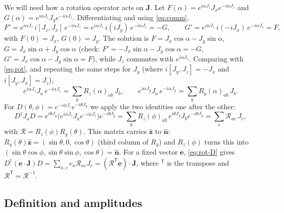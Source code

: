 \documentclass[11pt,a4paper]{article}
\newcommand{\vJ}{\bm{J}}
\newcommand{\vn}{\hat{\bm n}}
\begin{document}
We will need how a rotation operator acts on $\vJ$. Let $F(\alpha) = e^{i\alpha J_z}J_xe^{-i\alpha J_z}$ and
$G(\alpha) = e^{i\alpha J_z}J_ye^{-i\alpha J_z}$. Differentiating and using \eqref{eq:comm},
\begin{equation*}
  F' = e^{i\alpha J_z}\,i[J_z,J_x]\,e^{-i\alpha J_z} = e^{i\alpha J_z}\,i(iJ_y)\,e^{-i\alpha J_z} = -G,\qquad
  G' = e^{i\alpha J_z}\,i(-iJ_x)\,e^{-i\alpha J_z} = F,
\end{equation*}
with $F(0) = J_x$, $G(0) = J_y$. The solution is $F = J_x\cos\alpha - J_y\sin\alpha$, $G = J_x\sin\alpha +
J_y\cos\alpha$ (check: $F' = -J_x\sin\alpha - J_y\cos\alpha = -G$, $G' = J_x\cos\alpha - J_y\sin\alpha = F$), while
$J_z$ commutes with $e^{i\alpha J_z}$. Comparing with \eqref{eq:rot}, and repeating the same steps for $J_y$ (where
$i[J_y,J_z] = -J_x$ and $i[J_y,J_x] = J_z$),
\begin{equation}\label{eq:rot-J}
  e^{i\alpha J_z}J_a\,e^{-i\alpha J_z} = \sum_b R_z(\alpha)_{ab}\,J_b ,\qquad
  e^{i\alpha J_y}J_a\,e^{-i\alpha J_y} = \sum_b R_y(\alpha)_{ab}\,J_b .
\end{equation}
For $D(\theta,\phi) = e^{-i\phi J_z}e^{-i\theta J_y}$ we apply the two identities one after the other:
\begin{equation}\label{eq:rot-D}
  D^\dagger J_a D = e^{i\theta J_y}\big(e^{i\phi J_z}J_ae^{-i\phi J_z}\big)e^{-i\theta J_y}
  = \sum_b R_z(\phi)_{ab}\,e^{i\theta J_y}J_be^{-i\theta J_y} = \sum_{c} \mathcal R_{ac}\,J_c ,
\end{equation}
with $\mathcal R = R_z(\phi)R_y(\theta)$. This matrix carries $\hat{\bm z}$ to $\vn$: $R_y(\theta)\hat{\bm z} = (\sin\theta,0,\cos\theta)$ (third
column of $R_y$) and $R_z(\phi)$ turns this into $(\sin\theta\cos\phi,\sin\theta\sin\phi,\cos\theta) = \vn$.
For a fixed vector $\bm e$, \eqref{eq:rot-D} gives $D^\dagger(\bm e\cdot\vJ)D = \sum_{a,c}e_a\mathcal R_{ac}J_c =
(\mathcal R^{\mathsf T}\bm e)\cdot\vJ$, where $^{\mathsf T}$ is the transpose and $\mathcal R^{\mathsf T} = \mathcal
R^{-1}$.

\subsection{Definition and amplitudes}\label{sec:amplitudes}
\end{document}
